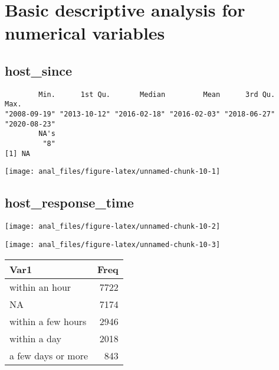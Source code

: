 \pagebreak

\hypertarget{basic-descriptive-analysis-for-numerical-variables}{%
\section{Basic descriptive analysis for numerical
variables}\label{basic-descriptive-analysis-for-numerical-variables}}

\hypertarget{host_since}{%
\subsection{host\_since}\label{host_since}}

\begin{verbatim}        Min.      1st Qu.       Median         Mean      3rd Qu.         Max. 
"2008-09-19" "2013-10-12" "2016-02-18" "2016-02-03" "2018-06-27" "2020-08-23" 
        NA's 
         "8" 
[1] NA

\end{verbatim}

\begin{center}\texttt{[image: anal\_files/figure-latex/unnamed-chunk-10-1]} \end{center}

\pagebreak

\hypertarget{host_response_time}{%
\subsection{host\_response\_time}\label{host_response_time}}

\begin{center}\texttt{[image: anal\_files/figure-latex/unnamed-chunk-10-2]} \end{center}

\begin{center}\texttt{[image: anal\_files/figure-latex/unnamed-chunk-10-3]} \end{center}

\begin{table}[H]
\centering
\begin{tabular}[t]{lr}
\toprule
Var1 & Freq\\
\midrule
within an hour & 7722\\
NA & 7174\\
within a few hours & 2946\\
within a day & 2018\\
a few days or more & 843\\
\bottomrule
\end{tabular}
\end{table}
\pagebreak

